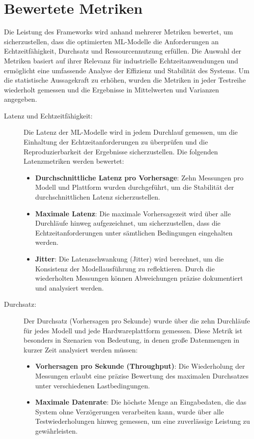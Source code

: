 \section{Bewertete Metriken}

Die Leistung des Frameworks wird anhand mehrerer Metriken bewertet, um sicherzustellen, dass die optimierten ML-Modelle die Anforderungen an Echtzeitfähigkeit, Durchsatz und Ressourcennutzung erfüllen. Die Auswahl der Metriken basiert auf ihrer Relevanz für industrielle Echtzeitanwendungen und ermöglicht eine umfassende Analyse der Effizienz und Stabilität des Systems. Um die statistische Aussagekraft zu erhöhen, wurden die Metriken in jeder Testreihe wiederholt gemessen und die Ergebnisse in Mittelwerten und Varianzen angegeben.

\begin{description}
\item[Latenz und Echtzeitfähigkeit:] Die Latenz der ML-Modelle wird in jedem Durchlauf gemessen, um die Einhaltung der Echtzeitanforderungen zu überprüfen und die Reproduzierbarkeit der Ergebnisse sicherzustellen. Die folgenden Latenzmetriken werden bewertet:
\begin{itemize}
\item \textbf{Durchschnittliche Latenz pro Vorhersage}: Zehn Messungen pro Modell und Plattform wurden durchgeführt, um die Stabilität der durchschnittlichen Latenz sicherzustellen.
\item \textbf{Maximale Latenz}: Die maximale Vorhersagezeit wird über alle Durchläufe hinweg aufgezeichnet, um sicherzustellen, dass die Echtzeitanforderungen unter sämtlichen Bedingungen eingehalten werden.
\item \textbf{Jitter}: Die Latenzschwankung (Jitter) wird berechnet, um die Konsistenz der Modellausführung zu reflektieren. Durch die wiederholten Messungen können Abweichungen präzise dokumentiert und analysiert werden.
\end{itemize}
\item[Durchsatz:] Der Durchsatz (Vorhersagen pro Sekunde) wurde über die zehn Durchläufe für jedes Modell und jede Hardwareplattform gemessen. Diese Metrik ist besonders in Szenarien von Bedeutung, in denen große Datenmengen in kurzer Zeit analysiert werden müssen:
\begin{itemize}
    \item \textbf{Vorhersagen pro Sekunde (Throughput)}: Die Wiederholung der Messungen erlaubt eine präzise Bewertung des maximalen Durchsatzes unter verschiedenen Lastbedingungen.
    \item \textbf{Maximale Datenrate}: Die höchste Menge an Eingabedaten, die das System ohne Verzögerungen verarbeiten kann, wurde über alle Testwiederholungen hinweg gemessen, um eine zuverlässige Leistung zu gewährleisten.
\end{itemize}


\end{description}
